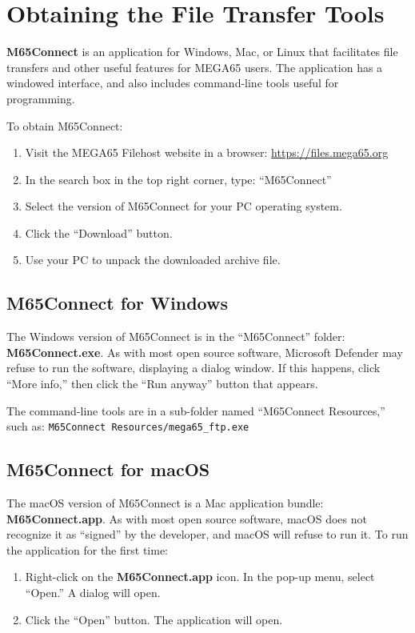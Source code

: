 \section{Obtaining the File Transfer Tools}

{\bf M65Connect} is an application for Windows, Mac, or Linux that facilitates file transfers and other useful features for MEGA65 users. The application has a windowed interface, and also includes command-line tools useful for programming.

To obtain M65Connect:

\begin{enumerate}
\item Visit the MEGA65 Filehost website in a browser: \url{https://files.mega65.org}
\item In the search box in the top right corner, type: ``M65Connect''
\item Select the version of M65Connect for your PC operating system.
\item Click the ``Download'' button.
\item Use your PC to unpack the downloaded archive file.
\end{enumerate}

\subsection{M65Connect for Windows}

The Windows version of M65Connect is in the ``M65Connect'' folder: {\bf M65Connect.exe}. As with most open source software, Microsoft Defender may refuse to run the software, displaying a dialog window. If this happens, click ``More info,'' then click the ``Run anyway'' button that appears.

The command-line tools are in a sub-folder named ``M65Connect Resources,'' such as: {\tt M65Connect Resources/mega65\_ftp.exe}

\subsection{M65Connect for macOS}

The macOS version of M65Connect is a Mac application bundle: {\bf M65Connect.app}. As with most open source software, macOS does not recognize it as ``signed'' by the developer, and macOS will refuse to run it. To run the application for the first time:

\begin{enumerate}
\item Right-click on the {\bf M65Connect.app} icon. In the pop-up menu, select ``Open.'' A dialog will open.
\item Click the ``Open'' button. The application will open.
\end{enumerate}

